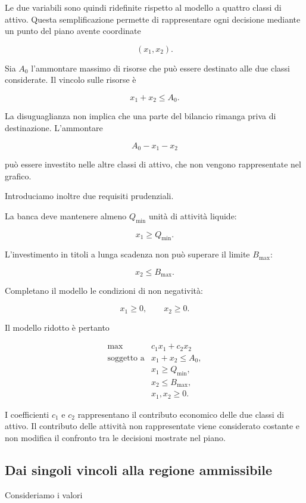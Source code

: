 Le due variabili sono quindi ridefinite rispetto al modello a quattro classi
di attivo. Questa semplificazione permette di rappresentare ogni decisione
mediante un punto del piano avente coordinate

\[
(x_1,x_2).
\]

Sia $A_0$ l'ammontare massimo di risorse che pu\`o essere destinato alle due
classi considerate. Il vincolo sulle risorse \`e

\[
x_1+x_2\leq A_0.
\]

La disuguaglianza non implica che una parte del bilancio rimanga priva di
destinazione. L'ammontare

\[
A_0-x_1-x_2
\]

pu\`o essere investito nelle altre classi di attivo, che non vengono
rappresentate nel grafico.

Introduciamo inoltre due requisiti prudenziali.

La banca deve mantenere almeno $Q_{\min}$ unit\`a di attivit\`a liquide:

\[
x_1\geq Q_{\min}.
\]

L'investimento in titoli a lunga scadenza non pu\`o superare il limite
$B_{\max}$:

\[
x_2\leq B_{\max}.
\]

Completano il modello le condizioni di non negativit\`a:

\[
x_1\geq0,
\qquad
x_2\geq0.
\]

Il modello ridotto \`e pertanto

\[
\begin{array}{ll}
\max
&
c_1x_1+c_2x_2
\\[4pt]
\mbox{soggetto a}
&
x_1+x_2\leq A_0,
\\[2pt]
&
x_1\geq Q_{\min},
\\[2pt]
&
x_2\leq B_{\max},
\\[2pt]
&
x_1,x_2\geq0.
\end{array}
\]

I coefficienti $c_1$ e $c_2$ rappresentano il contributo economico delle due
classi di attivo. Il contributo delle attivit\`a non rappresentate viene
considerato costante e non modifica il confronto tra le decisioni mostrate
nel piano.

\subsection{Dai singoli vincoli alla regione ammissibile}

Consideriamo i valori


